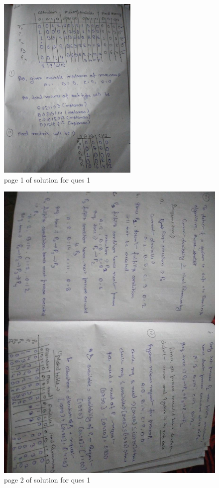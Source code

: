 \documentclass[11pt,a4paper,oneside]{article}
\begin{document}
\begin{figure}[hbt!]
	\centering
	\includegraphics[width=0.6\textwidth, angle=-90]{images/red_images/q1i1.jpg}
	\caption{page 1 of solution for ques 1}
\end{figure}

\begin{figure}[hbt!]
	\includegraphics[width=1\textwidth]{images/red_images/q1i2.jpg}
	\caption{page 2 of solution for ques 1}
\end{figure}
\end{document}
